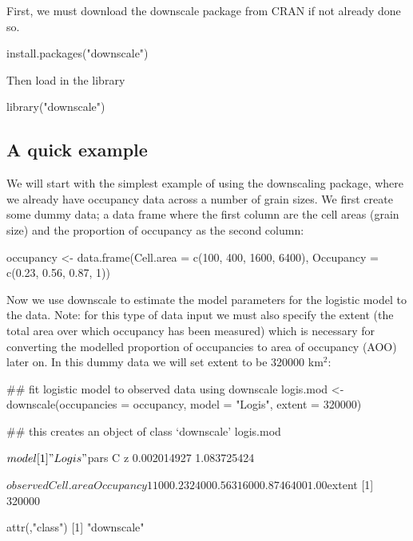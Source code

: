 \documentclass{article}[12pt, a4paper]
\begin{document}
First, we must download the downscale package from CRAN if not already done so.

\begin{Schunk}
\begin{Sinput}
install.packages("downscale")
\end{Sinput}
\end{Schunk}

Then load in the library

\begin{Schunk}
\begin{Sinput}
library("downscale")
\end{Sinput}
\end{Schunk}

\subsection{A quick example}
We will start with the simplest example of using the downscaling package, where we already have occupancy data across a number of grain sizes. We first create some dummy data; a data frame where the first column are the cell areas (grain size) and the proportion of occupancy as the second column:

\begin{Schunk}
\begin{Sinput}
occupancy <- data.frame(Cell.area = c(100, 400, 1600, 6400),
                        Occupancy = c(0.23, 0.56, 0.87, 1))
\end{Sinput}
\end{Schunk}

Now we use downscale to estimate the model parameters for the logistic model to the data. Note: for this type of data input we must also specify the extent (the total area over which occupancy has been measured) which is necessary for converting the modelled proportion of occupancies to area of occupancy (AOO) later on. In this dummy data we will set extent to be 320000 km$^2$:

\begin{Schunk}
\begin{Sinput}
## fit logistic model to observed data using downscale
logis.mod <- downscale(occupancies = occupancy,
                       model = "Logis",
                       extent = 320000)
                       
## this creates an object of class ‘downscale’
logis.mod
\end{Sinput}
\begin{Soutput}
$model
[1] "Logis"

$pars
          C           z 
0.002014927 1.083725424 

$observed
  Cell.area Occupancy
1       100      0.23
2       400      0.56
3      1600      0.87
4      6400      1.00

$extent
[1] 320000

attr(,"class")
[1] "downscale"

\end{Soutput}
\end{Schunk}
\end{document}
